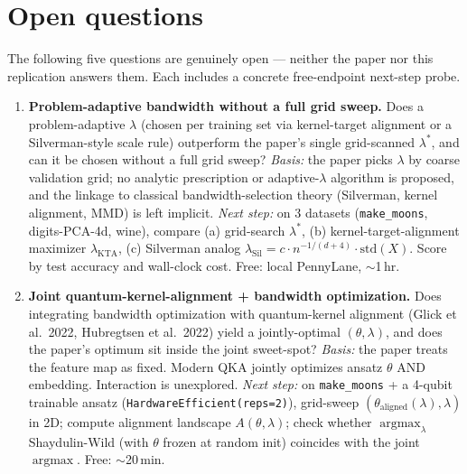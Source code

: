 \section{Open questions}

The following five questions are genuinely open --- neither the paper nor
this replication answers them. Each includes a concrete free-endpoint
next-step probe.

\begin{enumerate}

\item \textbf{Problem-adaptive bandwidth without a full grid sweep.}
Does a problem-adaptive $\lambda$ (chosen per training set via kernel-target
alignment or a Silverman-style scale rule) outperform the paper's single
grid-scanned $\lambda^*$, and can it be chosen without a full grid sweep?
\emph{Basis:} the paper picks $\lambda$ by coarse validation grid; no
analytic prescription or adaptive-$\lambda$ algorithm is proposed, and the
linkage to classical bandwidth-selection theory (Silverman, kernel alignment,
MMD) is left implicit.
\emph{Next step:} on 3 datasets (\texttt{make\_moons}, digits-PCA-4d, wine),
compare (a) grid-search $\lambda^*$, (b) kernel-target-alignment maximizer
$\lambda_{\text{KTA}}$, (c) Silverman analog $\lambda_{\text{Sil}} = c \cdot n^{-1/(d+4)} \cdot \mathrm{std}(X)$.
Score by test accuracy and wall-clock cost. Free: local PennyLane, $\sim$1\,hr.

\item \textbf{Joint quantum-kernel-alignment + bandwidth optimization.}
Does integrating bandwidth optimization with quantum-kernel alignment
(Glick et al.\ 2022, Hubregtsen et al.\ 2022) yield a jointly-optimal
$(\theta, \lambda)$, and does the paper's optimum sit inside the joint
sweet-spot?
\emph{Basis:} the paper treats the feature map as fixed. Modern QKA
jointly optimizes ansatz $\theta$ AND embedding. Interaction is unexplored.
\emph{Next step:} on \texttt{make\_moons} + a 4-qubit trainable ansatz
(\texttt{HardwareEfficient(reps=2)}), grid-sweep $(\theta_{\text{aligned}}(\lambda), \lambda)$
in 2D; compute alignment landscape $A(\theta, \lambda)$; check whether
$\operatorname{argmax}_\lambda$ Shaydulin-Wild (with $\theta$ frozen at random
init) coincides with the joint $\operatorname{argmax}$. Free: $\sim$20\,min.


\end{enumerate}

